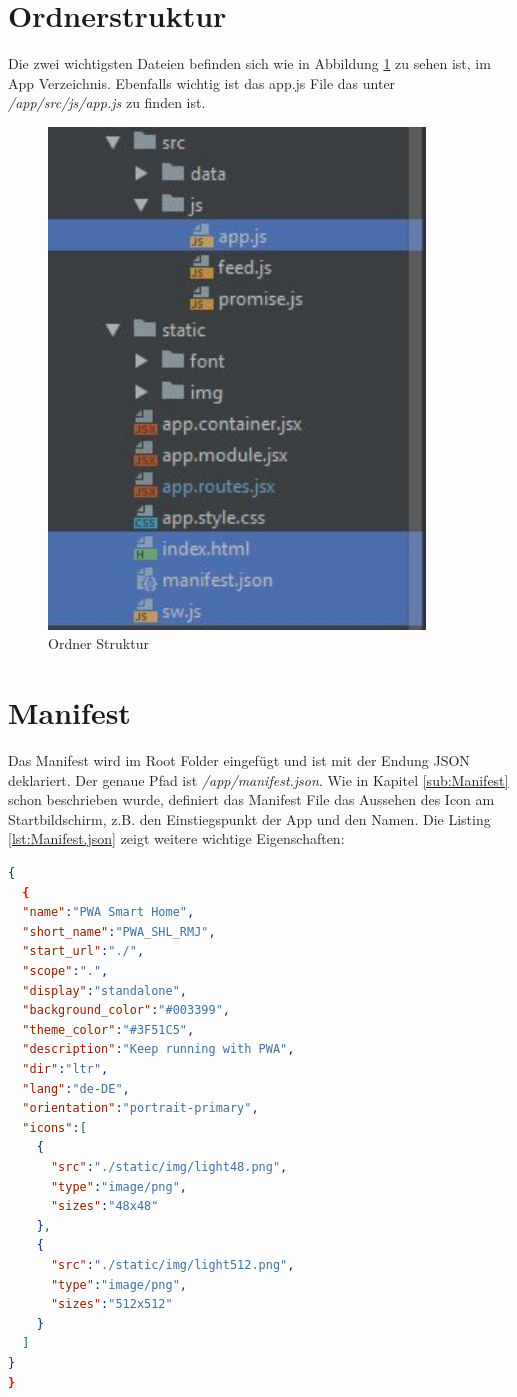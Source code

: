 \section{Ordnerstruktur}
Die zwei wichtigsten Dateien befinden sich wie in Abbildung \ref{fig:OrdnerStrucktur} zu sehen ist, im App Verzeichnis.
Ebenfalls wichtig ist das app.js File das unter \textit{/app/src/js/app.js} zu finden ist.

\begin{figure}[h]
	\centering
	\includegraphics[width=10cm]{BilderAllgemein/Implementierung/OrdnerStrucktur.jpg}\medskip
	\caption{Ordner Struktur}
	\label{fig:OrdnerStrucktur}
\end{figure} 


\section{Manifest}
Das Manifest wird im Root Folder eingefügt und ist mit der Endung \acs{JSON} deklariert. Der genaue Pfad ist \textit{/app/manifest.json}. Wie in Kapitel \ref{sub:Manifest} schon beschrieben wurde, definiert das Manifest File das Aussehen des Icon am Startbildschirm, z.B. den Einstiegspunkt der App und den Namen. 
Die Listing \ref{lst:Manifest.json} zeigt weitere wichtige Eigenschaften:
\newpage
\begin{lstlisting}[language=json, firstnumber=1, caption={Manifest in das Projekt implementieren},label=lst:Manifest.json, xleftmargin=50pt]
{
  {
  "name":"PWA Smart Home",
  "short_name":"PWA_SHL_RMJ",
  "start_url":"./",
  "scope":".",
  "display":"standalone",
  "background_color":"#003399",
  "theme_color":"#3F51C5",
  "description":"Keep running with PWA",
  "dir":"ltr",
  "lang":"de-DE",
  "orientation":"portrait-primary",
  "icons":[
    {
      "src":"./static/img/light48.png",
      "type":"image/png",
      "sizes":"48x48"
    },
    {
      "src":"./static/img/light512.png",
      "type":"image/png",
      "sizes":"512x512"
    }
  ]
}
}
\end{lstlisting}
\clearpage
